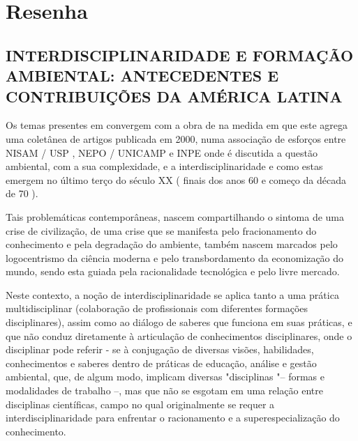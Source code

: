 \documentclass[
   article,       %
   12pt,          %
   oneside,       %
   a4paper,       %
   english,       %
   brazil,           %
   sumario=tradicional
   ]{abntex2}
\begin{document}

\frenchspacing 


\maketitle


\newpage

\textual
\section{Resenha}

\subsection{INTERDISCIPLINARIDADE E FORMAÇÃO AMBIENTAL:
ANTECEDENTES E CONTRIBUIÇÕES DA AMÉRICA LATINA}


Os temas presentes em \cite{Agenda_2030} convergem com a obra de \citeauthor{Interdiscipplinaridade_Ambientais} na medida em que este agrega uma coletânea de artigos publicada em 2000, numa associação de esforços entre NISAM / USP , NEPO / UNICAMP e INPE onde é discutida a questão ambiental, com a sua complexidade, e a interdisciplinaridade e como estas emergem no último terço do século XX ( finais dos anos 60 e começo da década de 70 ).

Tais problemáticas contemporâneas, nascem compartilhando o sintoma de uma crise de civilização, de uma crise que se manifesta pelo fracionamento do conhecimento e pela degradação do ambiente, também nascem marcados pelo logocentrismo da ciência moderna e pelo transbordamento da
economização do mundo, sendo esta guiada pela racionalidade tecnológica e pelo livre mercado.

Neste contexto, a noção de interdisciplinaridade se aplica tanto a uma prática multidisciplinar (colaboração de profissionais com diferentes formações disciplinares), assim como ao diálogo de saberes que funciona em suas práticas, e que não conduz diretamente à articulação de conhecimentos disciplinares, onde o disciplinar pode referir - se à conjugação de diversas visões, habilidades, conhecimentos e saberes dentro de práticas de educação, análise e gestão ambiental, que,  de algum modo, implicam diversas "disciplinas "– formas e modalidades de trabalho –, mas que não se esgotam em uma relação entre disciplinas científicas, campo no qual originalmente se requer a interdisciplinaridade para enfrentar o racionamento e a superespecialização do conhecimento.
\end{document}
